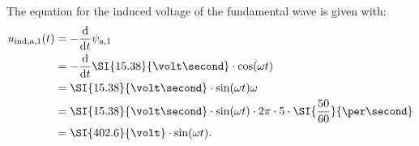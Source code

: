 \begin{solutionblock}
    The equation for the induced voltage of the fundamental wave is given with:
    \begin{align}
        \begin{split}
            u_{\mathrm{ind,a,}1}(t) & = -\frac{\mathrm{d}}{\mathrm{d}t}\psi_{\mathrm{a,}1}                                                     \\
                                    & = -\frac{\mathrm{d}}{\mathrm{d}t} \SI{15.38}{\volt\second} \cdot \cos(\omega t)                          \\
                                    & = \SI{15.38}{\volt\second} \cdot \sin(\omega t) \omega                                                   \\
                                    & = \SI{15.38}{\volt\second} \cdot \sin(\omega t) \cdot 2\pi \cdot 5 \cdot \SI{\frac{50}{60}}{\per\second} \\
                                    & = \SI{402.6}{\volt} \cdot \sin(\omega t).
        \end{split}
    \end{align}


\end{solutionblock}
